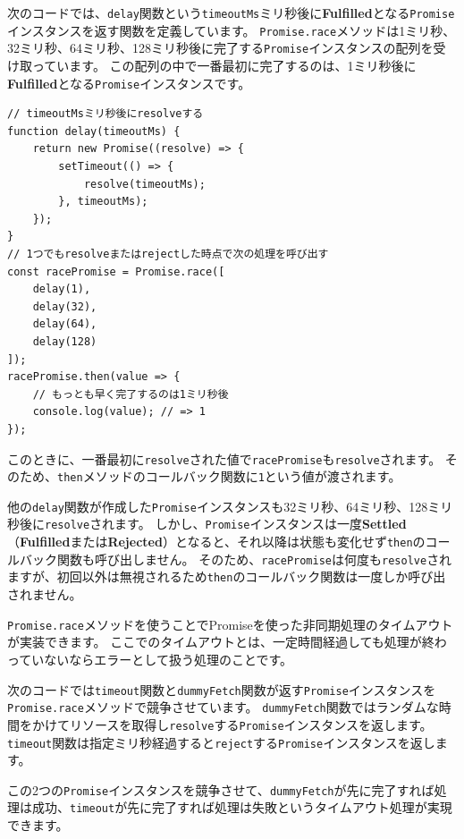 次のコードでは、\texttt{delay}関数という\texttt{timeoutMs}ミリ秒後に\textbf{Fulfilled}となる\texttt{Promise}インスタンスを返す関数を定義しています。
\texttt{Promise.race}メソッドは1ミリ秒、32ミリ秒、64ミリ秒、128ミリ秒後に完了する\texttt{Promise}インスタンスの配列を受け取っています。
この配列の中で一番最初に完了するのは、1ミリ秒後に\textbf{Fulfilled}となる\texttt{Promise}インスタンスです。

\begin{lstlisting}
// timeoutMsミリ秒後にresolveする
function delay(timeoutMs) {
    return new Promise((resolve) => {
        setTimeout(() => {
            resolve(timeoutMs);
        }, timeoutMs);
    });
}
// 1つでもresolveまたはrejectした時点で次の処理を呼び出す
const racePromise = Promise.race([
    delay(1),
    delay(32),
    delay(64),
    delay(128)
]);
racePromise.then(value => {
    // もっとも早く完了するのは1ミリ秒後
    console.log(value); // => 1
});
\end{lstlisting}

このときに、一番最初に\texttt{resolve}された値で\texttt{racePromise}も\texttt{resolve}されます。
そのため、\texttt{then}メソッドのコールバック関数に\texttt{1}という値が渡されます。

他の\texttt{delay}関数が作成した\texttt{Promise}インスタンスも32ミリ秒、64ミリ秒、128ミリ秒後に\texttt{resolve}されます。
しかし、\texttt{Promise}インスタンスは一度\textbf{Settled}（\textbf{Fulfilled}または\textbf{Rejected}）となると、それ以降は状態も変化せず\texttt{then}のコールバック関数も呼び出しません。
そのため、\texttt{racePromise}は何度も\texttt{resolve}されますが、初回以外は無視されるため\texttt{then}のコールバック関数は一度しか呼び出されません。

\texttt{Promise.race}メソッドを使うことでPromiseを使った非同期処理のタイムアウトが実装できます。
ここでのタイムアウトとは、一定時間経過しても処理が終わっていないならエラーとして扱う処理のことです。

次のコードでは\texttt{timeout}関数と\texttt{dummyFetch}関数が返す\texttt{Promise}インスタンスを\texttt{Promise.race}メソッドで競争させています。
\texttt{dummyFetch}関数ではランダムな時間をかけてリソースを取得し\texttt{resolve}する\texttt{Promise}インスタンスを返します。
\texttt{timeout}関数は指定ミリ秒経過すると\texttt{reject}する\texttt{Promise}インスタンスを返します。

この2つの\texttt{Promise}インスタンスを競争させて、\texttt{dummyFetch}が先に完了すれば処理は成功、\texttt{timeout}が先に完了すれば処理は失敗というタイムアウト処理が実現できます。

